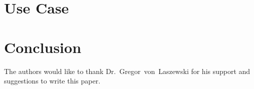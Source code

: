 \section{Use Case}

\section{Conclusion}



\begin{acks}

  The authors would like to thank Dr.~Gregor~von~Laszewski for his
  support and suggestions to write this paper.

\end{acks}


 

